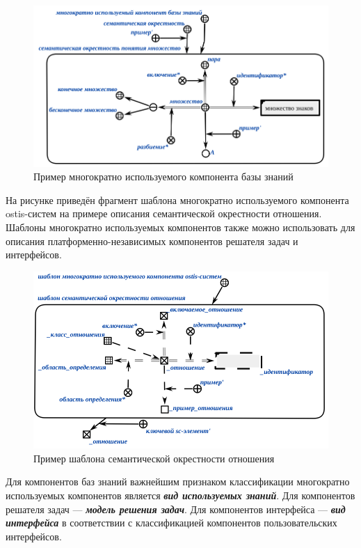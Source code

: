 \begin{figure}[H]
	\includegraphics[scale=0.6]{author/part5/figures/set_neighbourhood.png}
	\caption{Пример многократно используемого компонента базы знаний}
	\label{fig:set_neighbourhood}
\end{figure}

На рисунке  приведён фрагмент шаблона многократно используемого компонента ostis-систем на примере описания семантической окрестности отношения. Шаблоны многократно используемых компонентов также можно использовать для описания платформенно-независимых компонентов решателя задач и интерфейсов.

\begin{figure}[H]
	\includegraphics[scale=0.6]{author/part5/figures/relation_template.png}
	\caption{Пример шаблона семантической окрестности отношения}
	\label{fig:relation_template}
\end{figure}

Для компонентов баз знаний важнейшим признаком классификации многократно используемых компонентов является \textbf{\textit{вид используемых знаний}}. Для компонентов решателя задач --- \textbf{\textit{модель решения задач}}. Для компонентов интерфейса --- \textbf{\textit{вид интерфейса}} в соответствии с классификацией компонентов пользовательских интерфейсов.

